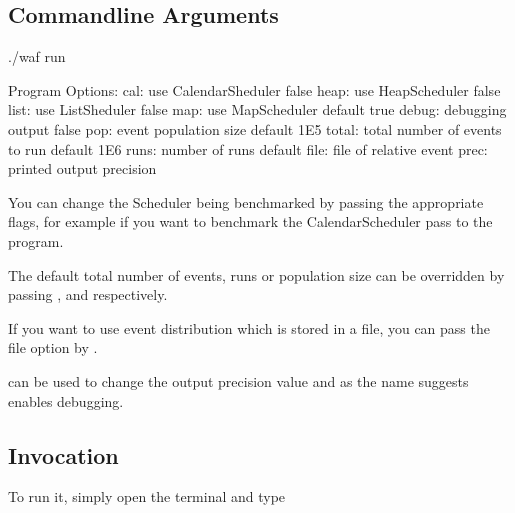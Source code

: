 \documentclass[letterpaper,10pt,english]{sphinxmanual}
\begin{document}
\subsection{Command\sphinxhyphen{}line Arguments}
\label{\detokenize{utilities:command-line-arguments}}
\begin{sphinxVerbatim}[commandchars=\\\{\}]
\PYGZdl{} ./waf \PYGZhy{}\PYGZhy{}run 

Program Options:
    \PYGZhy{}\PYGZhy{}cal:    use CalendarSheduler \PYG{o}{[}false\PYG{o}{]}
    \PYGZhy{}\PYGZhy{}heap:   use HeapScheduler \PYG{o}{[}false\PYG{o}{]}
    \PYGZhy{}\PYGZhy{}list:   use ListSheduler \PYG{o}{[}false\PYG{o}{]}
    \PYGZhy{}\PYGZhy{}map:    use MapScheduler default \PYG{o}{[}true\PYG{o}{]}
    \PYGZhy{}\PYGZhy{}debug:   debugging output \PYG{o}{[}false\PYG{o}{]}
    \PYGZhy{}\PYGZhy{}pop:    event population size default 1E5 \PYG{o}{[}\PYG{o}{]}
    \PYGZhy{}\PYGZhy{}total:  total number of events to run default 1E6 \PYG{o}{[}\PYG{o}{]}
    \PYGZhy{}\PYGZhy{}runs:   number of runs default  \PYG{o}{[}\PYG{o}{]}
    \PYGZhy{}\PYGZhy{}file:   file of relative event  \PYG{o}{[}\PYG{o}{]}
    \PYGZhy{}\PYGZhy{}prec:   printed output precision \PYG{o}{[}\PYG{o}{]}
\end{sphinxVerbatim}

You can change the Scheduler being benchmarked by passing
the appropriate flags, for example if you want to
benchmark the CalendarScheduler pass  to the program.

The default total number of events, runs or population size
can be overridden by passing , 
and  respectively.

If you want to use event distribution which is stored in a file,
you can pass the file option by .

 can be used to change the output precision value and
 as the name suggests enables debugging.


\subsection{Invocation}
\label{\detokenize{utilities:id2}}
To run it, simply open the terminal and type
\end{document}

